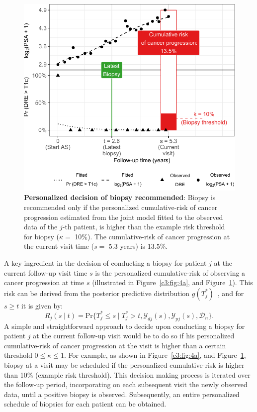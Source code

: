 \begin{figure}
\includegraphics{contents/c3/images/c3_fig4b.pdf}
\caption{\textbf{Personalized decision of biopsy recommended}: Biopsy is recommended only if the personalized cumulative-risk of cancer progression estimated from the joint model fitted to the observed data of the $j$-th patient, is higher than the example risk threshold for biopsy ($\kappa=$ 10\%). The cumulative-risk of cancer progression at the current visit time ($s=$ 5.3 years) is 13.5\%.}
\label{c3:fig:4b}
\end{figure}

A key ingredient in the decision of conducting a biopsy for patient $j$ at the current follow-up visit time $s$ is the personalized cumulative-risk of observing a cancer progression at time $s$ (illustrated in Figure~\ref{c3:fig:4a}, and Figure~\ref{c3:fig:4b}). This risk can be derived from the posterior predictive distribution $g(T^*_j)$~\citep{rizopoulos2011dynamic}, and for $s \geq t$ it is given by:
\begin{equation}
\label{c3:eq:dynamic_risk_prob}
R_j(s \mid t) = \mbox{Pr}\big\{T^*_j \leq s \mid T^*_j > t, \mathcal{Y}_{dj}(s), \mathcal{Y}_{pj}(s), \mathcal{D}_n\big\}.
\end{equation}
A simple and straightforward approach to decide upon conducting a biopsy for patient $j$ at the current follow-up visit would be to do so if his personalized cumulative-risk of cancer progression at the visit is higher than a certain threshold $0 \leq \kappa \leq 1$. For example, as shown in Figure~\ref{c3:fig:4a}, and Figure~\ref{c3:fig:4b}, biopsy at a visit may be scheduled if the personalized cumulative-risk is higher than 10\% (example risk threshold). This decision making process is iterated over the follow-up period, incorporating on each subsequent visit the newly observed data, until a positive biopsy is observed. Subsequently, an entire personalized schedule of biopsies for each patient can be obtained.

